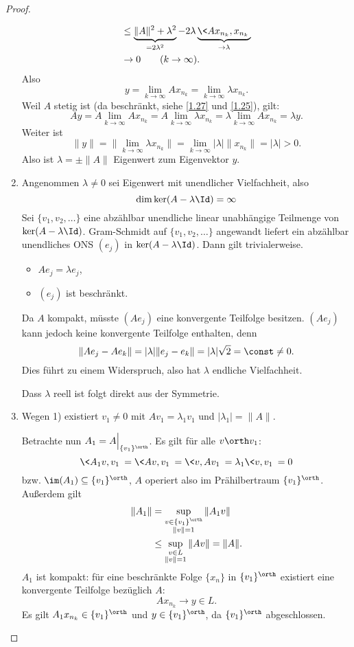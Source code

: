 \begin{st}
\begin{proof}
\begin{enumerate}[1)]
\begin{align*}
					&\le \underbrace{\|A\|^2 + \lambda^2}_{=2\lambda^2} - 2 \lambda \underbrace{\<Ax_{n_k}, x_{n_k}\>}_{\to \lambda} \\
					& \to 0 \qquad (k\to \infty).
				\end{align*}
				Also 
				\[
					y = \lim_{k\to \infty} Ax_{n_k} = \lim_{k\to \infty} \lambda x_{n_k}.
				\]
				Weil $A$ stetig ist (da beschränkt, siehe \ref{1.27} und \ref{1.25}), gilt:
				\[
					Ay 
					= A \lim_{k\to\infty} A x_{n_k} 
					= A \lim_{k\to\infty} \lambda x_{n_k}
					= \lambda \lim_{k\to\infty} Ax_{n_k}
					= \lambda y.
				\]
				Weiter ist
				\[
					\|y\| 
					= \Big\|\lim_{k\to\infty} \lambda x_{n_k}\Big\|
					= \lim_{k\to\infty} |\lambda| \|x_{n_k}\|
					= |\lambda|
					> 0.
				\]
				Also ist $\lambda = \pm \|A\|$ Eigenwert zum Eigenvektor $y$. 
			\item

				Angenommen $\lambda \neq 0$ sei Eigenwert mit unendlicher Vielfachheit, also
				\[
					\dim \ker (A - \lambda \Id) = \infty
				\]
				Sei $\{v_1,v_2,\dotsc\}$ eine abzählbar unendliche linear unabhängige Teilmenge von $\ker(A-\lambda \Id)$.
				Gram-Schmidt auf $\{v_1,v_2,\dotsc\}$ angewandt liefert ein abzählbar unendliches ONS $(e_j)$ in $\ker (A-\lambda \Id)$.
				Dann gilt trivialerweise.
				\begin{itemize}
					\item
						$Ae_j = \lambda e_j$,
					\item
						$(e_j)$ ist beschränkt.
				\end{itemize}
				Da $A$ kompakt, müsste $(Ae_j)$ eine konvergente Teilfolge besitzen.
				$(Ae_j)$ kann jedoch keine konvergente Teilfolge enthalten, denn
				\[
					\|Ae_j - Ae_k\| = |\lambda| \|e_j-e_k\| = |\lambda| \sqrt 2 = \const \neq 0.
				\]
				Dies führt zu einem Widerspruch, also hat $\lambda$ endliche Vielfachheit.

				Dass $\lambda$ reell ist folgt direkt aus der Symmetrie.
			\item
				Wegen 1) existiert $v_1 \neq 0$ mit $Av_1 = \lambda_1v_1$ und $|\lambda_1| = \|A\|$.

				Betrachte nun $A_1 = A \Big|_{\{v_1\}^\orth}$.
				Es gilt für alle $v \orth v_1$:
				\[
					\<A_1v,v_1\> = \<Av,v_1\> = \<v,Av_1\> = \lambda_1\<v,v_1\> = 0
				\]
				bzw. $\im (A_1) \subset \{v_1\}^\orth$, $A$ operiert also im Prähilbertraum $\{v_1\}^\orth$.
				Außerdem gilt
				\begin{align*}
					\|A_1\| 
					&= \sup_{\substack{v\in \{v_1\}^\orth \\ \|v\|=1}} \|A_1 v\| \\
					&\le \sup_{\substack{v\in L \\ \|v\|=1}} \|A v\| 
					= \|A\|.
				\end{align*}
				$A_1$ ist kompakt: für eine beschränkte Folge $\{x_n\}$ in $\{v_1\}^\orth$ existiert eine konvergente Teilfolge bezüglich $A$:
				\[
					A x_{n_k} \to y \in L.
				\]
				Es gilt $A_1 x_{n_k} \in \{v_1\}^\orth$ und $y \in \{v_1\}^\orth$, da $\{v_1\}^\orth$ abgeschlossen.


\end{enumerate}
\end{proof}
\end{st}
